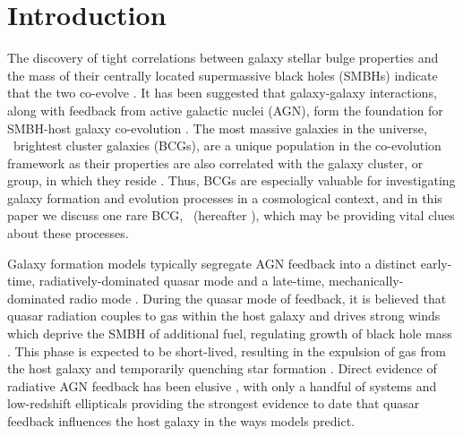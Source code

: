 \documentclass[useAMS,usenatbib]{mn2e}
\begin{document}
\section{Introduction}
\label{sec:intro}

The discovery of tight correlations between galaxy stellar bulge
properties and the mass of their centrally located supermassive black
holes (SMBHs) indicate that the two co-evolve
\citep[\eg][]{1995ARA&A..33..581K, magorrian, 2000ApJ...539L...9F,
  2000ApJ...539L..13G, 2001ApJ...563L..11G}. It has been suggested
that galaxy-galaxy interactions, along with feedback from active
galactic nuclei (AGN), form the foundation for SMBH-host galaxy
co-evolution \citep[\eg][]{1995MNRAS.276..663B, 1998A&A...331L...1S,
  2000MNRAS.311..576K, 2001MNRAS.324..757G}. The most massive galaxies
in the universe, \eg\ brightest cluster galaxies (BCGs), are a unique
population in the co-evolution framework as their properties are also
correlated with the galaxy cluster, or group, in which they reside
\citep[\eg][]{1984ApJ...276...38J, 1998ApJ...502..141D}. Thus, BCGs
are especially valuable for investigating galaxy formation and
evolution processes in a cosmological context, and in this paper we
discuss one rare BCG, \inine\ (hereafter \irs), which may be providing
vital clues about these processes.

Galaxy formation models typically segregate AGN feedback into a
distinct early-time, radiatively-dominated quasar mode
\citep[\eg][]{2005Natur.435..629S, 2006ApJS..163....1H} and a
late-time, mechanically-dominated radio mode \citep[\eg][]{croton06,
  bower06}. During the quasar mode of feedback, it is believed that
quasar radiation couples to gas within the host galaxy and drives
strong winds which deprive the SMBH of additional fuel, regulating
growth of black hole mass \citep[\eg][]{2005ApJ...630..705H,
  2005Natur.433..604D}. This phase is expected to be short-lived,
resulting in the expulsion of gas from the host galaxy and temporarily
quenching star formation \citep[\eg][]{2006ApJ...642L.107N,
  2008ApJ...686..219M}. Direct evidence of radiative AGN feedback has
been elusive \citep[see][for a review]{2005ARA&A..43..769V}, with only
a handful of systems \citep[\eg][]{2008A&A...492...81P,
  2010A&A...518L.155F} and low-redshift ellipticals
\citep{2009ApJ...690.1672S} providing the strongest evidence to date
that quasar feedback influences the host galaxy in the ways models
predict.
\end{document}
